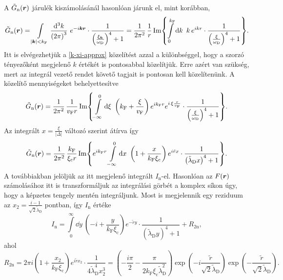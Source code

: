 \documentclass[a4paper,12pt,titlepage]{article}
\newcommand{\KK}{{\vb*{k}}}
\newcommand{\RR}{{\vb*{r}}}
\newcommand{\kF}{{k_\text{F}}}
\newcommand{\vF}{{v_\text{F}}}
\newcommand{\xic}{{\xi_\text{c}}}
\begin{document}
A $\tilde{G}_\text{n}(\RR)$ járulék kiszámolásánál hasonlóan járunk el, mint korábban,
\begin{equation}
	\tilde{G}_\text{n}(\RR) = \int\limits_{\left| \KK \right| < \kF} \frac{\dd[3]{k}}{\left( 2 \pi \right)^3} ~ e^{-i \KK \RR} \cdot \frac{1}{\left( \frac{\xi_\KK}{\omega_\text{D}} \right)^4 + 1} = \frac{1}{2 \pi^2} \, \frac{1}{r} \Im{ \int\limits_0^{\kF} \dd{k} ~ k \, e^{i k r} \cdot \frac{1}{\left( \frac{\xi}{\omega_\text{D}} \right)^4 + 1} }.
\end{equation}
Itt is elvégezhetjük a \eqref{k-xi-approx} közelítést azzal a különbséggel, hogy a szorzó tényezőként megjelenő $k$ értékét is pontosabbal közelítjük.  Erre azért van szükség, mert az integrál vezető rendet követő tagjait is pontosan kell közelítenünk.  A közelítő mennyiségeket behelyettesítve
\begin{equation}
	\tilde{G}_\text{n}(\RR) = \frac{1}{2 \pi^2} \, \frac{1}{\vF r} \Im{ \int\limits_{-\infty}^0 \dd{\xi} ~ \left( \kF + \frac{\xi}{\vF} \right) e^{i \kF r} e^{i \, \xi \frac{r}{\vF}} \cdot \frac{1}{\left( \frac{\xi}{\omega_\text{D}} \right)^4 + 1} }.
\end{equation}
Az integrált $x = \frac{\xi}{\left| \Delta \right|}$ változó szerint átírva így
\begin{equation}
	\tilde{G}_\text{n}(\RR) = \frac{1}{2 \pi^2} \, \frac{\kF}{\xic r} \Im{ e^{i \kF r} \int\limits_{-\infty}^0 \dd{x} ~ \left( 1 + \frac{x}{\kF \xic} \right) e^{i \tilde{r} x} \cdot \frac{1}{\left( \tilde{\lambda}_\text{D} x \right)^4 + 1} }.
\end{equation}
A továbbiakban jelöljük az itt megjelenő integrált $I_\text{n}$-el.  Hasonlóan az $F(\RR)$ számolásához itt is transzformáljuk az integrálási görbét a komplex síkon úgy, hogy a képzetes tengely mentén integráljunk.  Most is megjelennik egy reziduum az $x_2 = \frac{i - 1}{\sqrt{2} \tilde{\lambda}_\text{D}}$ pontban, így $I_\text{n}$ értéke
\begin{equation}
	I_\text{n} = \int\limits_0^\infty \dd{y} ~ \left( -i + \frac{y}{\kF \xic} \right) e^{-\tilde{r} y} \cdot \frac{1}{\left( \tilde{\lambda}_\text{D} y \right)^4 + 1} + R_{2 \text{n}},
\end{equation}
ahol
\begin{equation}
	R_{2 \text{n}} = 2 \pi i \left( 1 + \frac{x_2}{\kF \xic} \right) e^{i \tilde{r} x_2} \cdot \frac{1}{4 \tilde{\lambda}_\text{D}^4 x_2^3} = \left( -\frac{i \pi}{2} - \frac{\pi}{2 \kF \xic \tilde{\lambda}_\text{D}^2} \right) \exp(-i \frac{\tilde{r}}{\sqrt{2} \tilde{\lambda}_\text{D}}) \exp(-\frac{\tilde{r}}{\sqrt{2} \tilde{\lambda}_\text{D}}).
\end{equation}
\end{document}
